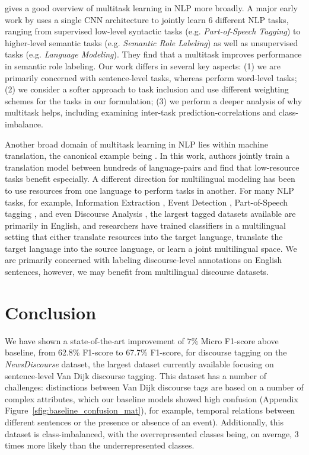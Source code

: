 \documentclass[11pt]{article}
\begin{document}
\citet{ruder2017overview} gives a good overview of multitask learning in NLP more broadly. A major early work by \citet{collobert2008unified} uses a single CNN architecture to jointly learn $6$ different NLP tasks, ranging from supervised low-level syntactic tasks (e.g. \textit{Part-of-Speech Tagging}) to higher-level semantic tasks (e.g. \textit{Semantic Role Labeling}) as well as unsupervised tasks (e.g. \textit{Language Modeling}). They find that a multitask improves performance in semantic role labeling. Our work differs in several key aspects: (1) we are primarily concerned with sentence-level tasks, whereas \citeauthor{collobert2008unified} perform word-level tasks; (2) we consider a softer approach to task inclusion and use different weighting schemes for the tasks in our formulation; (3) we perform a deeper analysis of why multitask helps, including examining inter-task prediction-correlations and class-imbalance.

Another broad domain of multitask learning in NLP lies within machine translation, the canonical example being \citet{aharoni2019massively}. In this work, authors jointly train a translation model between hundreds of language-pairs and find that low-resource tasks benefit especially. A different direction for multilingual modeling has been to use resources from one language to perform tasks in another. For many NLP tasks, for example, Information Extraction \cite{wiedemann2018multilingual,neveol2017clef,poibeau2012multi}, Event Detection \cite{liu2018event,agerri2016multilingual,lejeune2015multilingual}, Part-of-Speech tagging \cite{plank2016multilingual,naseem2009multilingual}, and even Discourse Analysis \cite{liu2020multilingual}, the largest tagged datasets available are primarily in English, and researchers have trained classifiers in a multilingual setting that either translate resources into the target language, translate the target language into the source language, or learn a joint multilingual space. We are primarily concerned with labeling discourse-level annotations on English sentences, however, we may benefit from multilingual discourse datasets. 

\section{Conclusion}

We have shown a state-of-the-art improvement of $7\%$ Micro F1-score above baseline, from 62.8\% F1-score to 67.7\% F1-score, for discourse tagging on the \textit{NewsDiscourse} dataset, the largest dataset currently available focusing on sentence-level Van Dijk discourse tagging. This dataset has a number of challenges: distinctions between Van Dijk discourse tags are based on a number of complex attributes, which our baseline models showed high confusion (Appendix Figure~\ref{sfig:baseline_confusion_mat}), for example, temporal relations between different sentences or the presence or absence of an event). Additionally, this dataset is class-imbalanced, with the overrepresented classes being, on average, $3$ times more likely than the underrepresented classes. 
\end{document}
